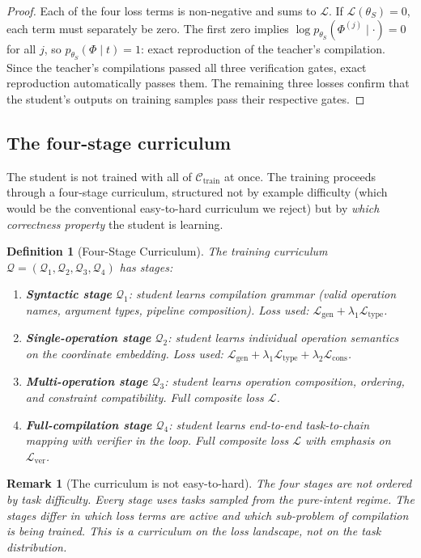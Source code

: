 \documentclass[twocolumn,11pt,a4paper]{article}
\newtheorem{definition}[theorem]{Definition}
\newtheorem{remark}[theorem]{Remark}
\newcommand{\cC}{\mathcal{C}}
\newcommand{\cL}{\mathcal{L}}
\newcommand{\cQ}{\mathcal{Q}}
\begin{document}
\begin{proof}
Each of the four loss terms is non-negative and sums to $\cL$. If $\cL(\theta_S) = 0$, each term must separately be zero. The first zero implies $\log p_{\theta_S}(\Phi^{(j)} \mid \cdot) = 0$ for all $j$, so $p_{\theta_S}(\Phi \mid t) = 1$: exact reproduction of the teacher's compilation. Since the teacher's compilations passed all three verification gates, exact reproduction automatically passes them. The remaining three losses confirm that the student's outputs on training samples pass their respective gates.
\end{proof}

\subsection{The four-stage curriculum}

The student is not trained with all of $\cC_{\mathrm{train}}$ at once. The training proceeds through a four-stage curriculum, structured not by example difficulty (which would be the conventional easy-to-hard curriculum we reject) but by \emph{which correctness property} the student is learning.

\begin{definition}[Four-Stage Curriculum]
\label{def:curriculum}
The training curriculum $\cQ = (\cQ_1, \cQ_2, \cQ_3, \cQ_4)$ has stages:
\begin{enumerate}[leftmargin=*,itemsep=1pt]
\item \textbf{Syntactic stage} $\cQ_1$: student learns compilation grammar (valid operation names, argument types, pipeline composition). Loss used: $\cL_{\mathrm{gen}} + \lambda_1 \cL_{\mathrm{type}}$.
\item \textbf{Single-operation stage} $\cQ_2$: student learns individual operation semantics on the coordinate embedding. Loss used: $\cL_{\mathrm{gen}} + \lambda_1 \cL_{\mathrm{type}} + \lambda_2 \cL_{\mathrm{cons}}$.
\item \textbf{Multi-operation stage} $\cQ_3$: student learns operation composition, ordering, and constraint compatibility. Full composite loss $\cL$.
\item \textbf{Full-compilation stage} $\cQ_4$: student learns end-to-end task-to-chain mapping with verifier in the loop. Full composite loss $\cL$ with emphasis on $\cL_{\mathrm{ver}}$.
\end{enumerate}
\end{definition}

\begin{remark}[The curriculum is not easy-to-hard]
The four stages are not ordered by task difficulty. Every stage uses tasks sampled from the pure-intent regime. The stages differ in which \emph{loss terms} are active and which \emph{sub-problem} of compilation is being trained. This is a curriculum on the loss landscape, not on the task distribution.
\end{remark}
\end{document}
